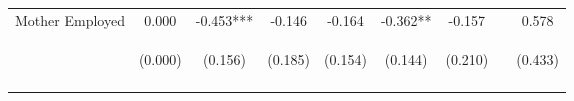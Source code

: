 \begin{tabular}{lcccccccc}
\noalign{\smallskip}Mother Employed & 0.000 & -0.453*** & -0.146 & -0.164 & -0.362** & -0.157 &  & 0.578\\
 & \begin{footnotesize}(0.000)\end{footnotesize} & \begin{footnotesize}(0.156)\end{footnotesize} & \begin{footnotesize}(0.185)\end{footnotesize} & \begin{footnotesize}(0.154)\end{footnotesize} & \begin{footnotesize}(0.144)\end{footnotesize} & \begin{footnotesize}(0.210)\end{footnotesize} & \begin{footnotesize}\end{footnotesize} & \begin{footnotesize}(0.433)\end{footnotesize}\\
\noalign{\smallskip}\hline\end{tabular}\\
